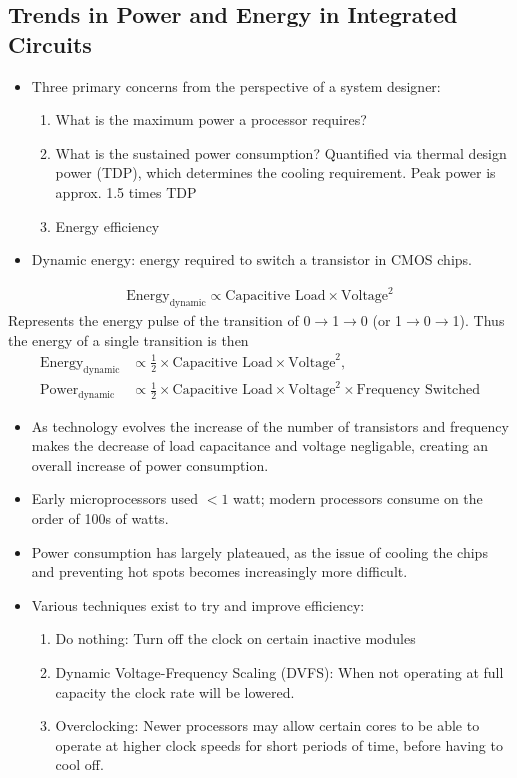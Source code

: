 \documentclass[11pt, a4paper]{article}
\theoremstyle{definition}
\theoremstyle{remark}
\begin{document}
\subsection{Trends in Power and Energy in Integrated Circuits}
\begin{itemize}
    \item Three primary concerns from the perspective of a system designer:
    \begin{enumerate}
        \item What is the maximum power a processor requires?
        \item What is the sustained power consumption? Quantified via thermal design power (TDP), which determines the cooling requirement. Peak power is approx. 1.5 times TDP
        \item Energy efficiency
    \end{enumerate}
    \item Dynamic energy: energy required to switch a transistor in CMOS chips.
\end{itemize}
\begin{align*}
    \text{Energy}_{\text{dynamic}} \propto \text{Capacitive Load} \times \text{Voltage}^2
\end{align*}
Represents the energy pulse of the transition of 0$\rightarrow$1$\rightarrow$0 (or 1$\rightarrow$0$\rightarrow$1). Thus the energy of a single transition is then
\begin{align*}
    \text{Energy}_{\text{dynamic}} &\propto \frac{1}{2} \times \text{Capacitive Load} \times \text{Voltage}^2, \\
    \text{Power}_{\text{dynamic}} &\propto \frac{1}{2} \times \text{Capacitive Load} \times \text{Voltage}^2 \times \text{Frequency Switched}
\end{align*}
\begin{itemize}
    \item As technology evolves the increase of the number of transistors and frequency makes the decrease of load capacitance and voltage negligable, creating an overall increase of power consumption.
    \item Early microprocessors used $<1$ watt; modern processors consume on the order of 100s of watts.
    \item Power consumption has largely plateaued, as the issue of cooling the chips and preventing hot spots becomes increasingly more difficult.
    \item Various techniques exist to try and improve efficiency:
    \begin{enumerate}
        \item Do nothing: Turn off the clock on certain inactive modules
        \item Dynamic Voltage-Frequency Scaling (DVFS): When not operating at full capacity the clock rate will be lowered.
        \item Overclocking: Newer processors may allow certain cores to be able to operate at higher clock speeds for short periods of time, before having to cool off.
    \end{enumerate}
\end{itemize}
\end{document}
